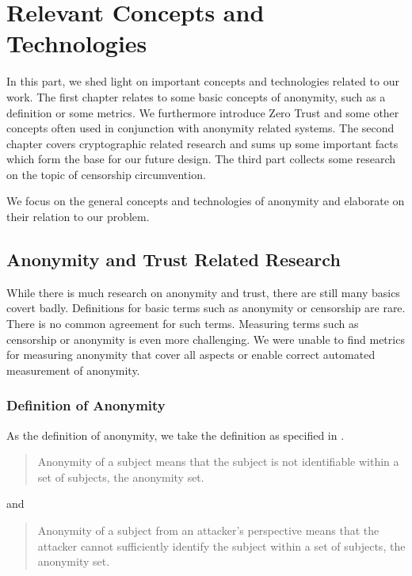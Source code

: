 
\part{Relevant Concepts and Technologies}\label{sec:concepts}
In this part, we shed light on important concepts and technologies related to our work. The first chapter relates to some basic concepts of anonymity, such as a definition or some metrics. We furthermore introduce Zero Trust and some other concepts often used in conjunction with anonymity related systems. The second chapter covers cryptographic related research and sums up some important facts which form the base for our future design. The third part collects some research on the topic of censorship circumvention.

We focus on the general concepts and technologies of anonymity and elaborate on their relation to our problem.

\chapter{Anonymity and Trust Related Research}
While there is much research on anonymity and trust, there are still many basics covert badly. Definitions for basic terms such as anonymity or censorship are rare. There is no common agreement for such terms. Measuring terms such as censorship or anonymity is even more challenging. We were unable to find metrics for measuring anonymity that cover all aspects or enable correct automated measurement of anonymity.

\section{Definition of Anonymity}
As the definition of anonymity, we take the definition as specified in \cite{anonTerminology}.
\begin{quote}
	Anonymity of a subject means that the subject is not identifiable within a set of subjects, the anonymity set.\omitted
\end{quote}
and
\begin{quote}
	Anonymity of a subject from an attacker's perspective means that the attacker cannot sufficiently identify the subject within a set of subjects, the anonymity set.\omitted
\end{quote}


